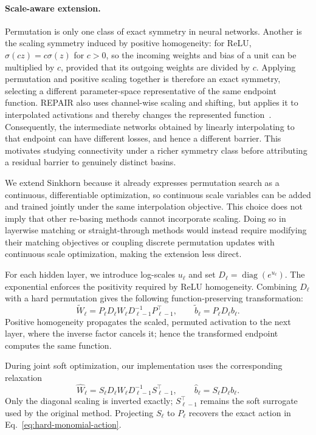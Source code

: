 \documentclass[twoside]{article}
\begin{document}
\paragraph{Scale-aware extension.}
Permutation is only one class of exact symmetry in neural networks.  Another
is the scaling symmetry induced by positive homogeneity: for ReLU,
$\sigma(cz)=c\sigma(z)$ for $c>0$, so the incoming weights and bias of a unit
can be multiplied by $c$, provided that its outgoing weights are divided by
$c$.  Applying permutation and positive scaling together is therefore an exact
symmetry, selecting a different parameter-space representative of the same
endpoint function.  REPAIR also uses channel-wise scaling and shifting, but
applies it to interpolated activations and thereby changes the represented
function~\citep{jordan2023repair}.  Consequently, the intermediate networks
obtained by linearly interpolating to that endpoint can have different losses,
and hence a different barrier.  This motivates studying connectivity under a
richer symmetry class before attributing a residual barrier to genuinely
distinct basins.

We extend Sinkhorn because it already expresses permutation search as a
continuous, differentiable optimization, so continuous scale variables can be
added and trained jointly under the same interpolation objective.  This choice
does not imply that other re-basing methods cannot incorporate scaling.
Doing so in layerwise matching or straight-through methods would instead
require modifying their matching objectives or coupling discrete permutation
updates with continuous scale optimization, making the extension less direct.

For each hidden layer, we introduce log-scales $u_\ell$ and set
$D_\ell=\operatorname{diag}(e^{u_\ell})$.  The exponential
enforces the positivity required by ReLU homogeneity.  Combining $D_\ell$ with
a hard permutation gives the following function-preserving transformation:
\begin{equation}
\widetilde W_\ell
=P_\ell D_\ell W_\ell D_{\ell-1}^{-1}P_{\ell-1}^{\top},
\qquad
\widetilde b_\ell=P_\ell D_\ell b_\ell.
\label{eq:hard-monomial-action}
\end{equation}
Positive homogeneity propagates the scaled, permuted activation to the next
layer, where the inverse factor cancels it; hence the transformed endpoint
computes the same function.

During joint soft optimization, our implementation uses the corresponding
relaxation
\begin{equation}
\widehat W_\ell
=S_\ell D_\ell W_\ell D_{\ell-1}^{-1}S_{\ell-1}^{\top},
\qquad
\widehat b_\ell=S_\ell D_\ell b_\ell.
\label{eq:soft-monomial-action}
\end{equation}
Only the diagonal scaling is inverted exactly; $S_{\ell-1}^{\top}$ remains the
soft surrogate used by the original method.  Projecting $S_\ell$ to $P_\ell$
recovers the exact action in Eq.~\ref{eq:hard-monomial-action}.
\end{document}
